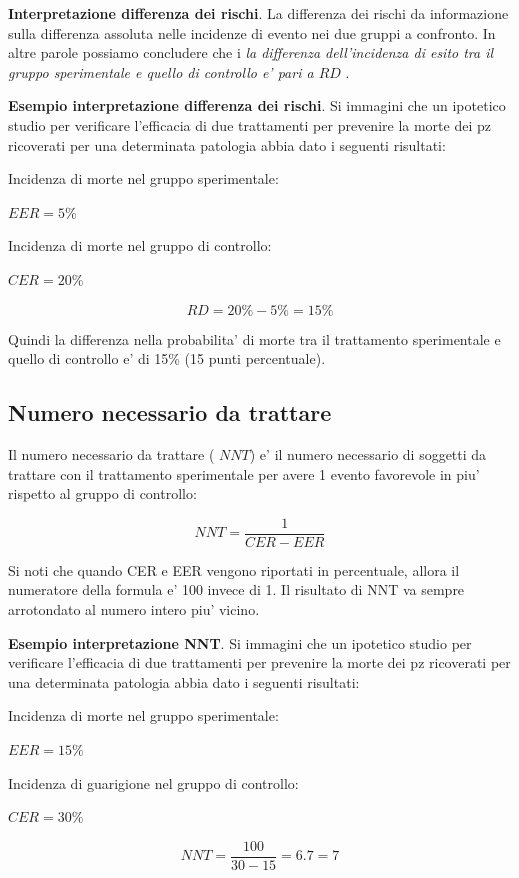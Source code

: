 \documentclass[]{book}
\begin{document}
\textbf{Interpretazione differenza dei rischi}. La differenza dei rischi da informazione sulla differenza assoluta nelle incidenze di evento nei due gruppi a confronto. In altre parole possiamo concludere che i \emph{la differenza dell'incidenza di esito tra il gruppo sperimentale e quello di controllo e' pari a \(RD\) }.

\textbf{Esempio interpretazione differenza dei rischi}. Si immagini che un ipotetico studio per verificare l'efficacia di due trattamenti per prevenire la morte dei pz ricoverati per una determinata patologia abbia dato i seguenti risultati:

Incidenza di morte nel gruppo sperimentale:

\(EER = 5\%\)

Incidenza di morte nel gruppo di controllo:

\(CER= 20\%\)

\[RD = 20\%-5\% = 15\%\]

Quindi la differenza nella probabilita' di morte tra il trattamento sperimentale e quello di controllo e' di 15\% (15 punti percentuale).

\hypertarget{numero-necessario-da-trattare}{%
\subsection{Numero necessario da trattare}\label{numero-necessario-da-trattare}}

Il numero necessario da trattare ( \(NNT\)) e' il numero necessario di soggetti da trattare con il trattamento sperimentale per avere 1 evento favorevole in piu' rispetto al gruppo di controllo:

\[ NNT = \frac{1}{ CER -EER}\]

Si noti che quando CER e EER vengono riportati in percentuale, allora il numeratore della formula e' 100 invece di 1. Il risultato di NNT va sempre arrotondato al numero intero piu' vicino.

\textbf{Esempio interpretazione NNT}. Si immagini che un ipotetico studio per verificare l'efficacia di due trattamenti per prevenire la morte dei pz ricoverati per una determinata patologia abbia dato i seguenti risultati:

Incidenza di morte nel gruppo sperimentale:

\(EER = 15\%\)

Incidenza di guarigione nel gruppo di controllo:

\(CER= 30\%\)

\[NNT = \frac{100}{30-15} = 6.7 = 7\]
\end{document}

